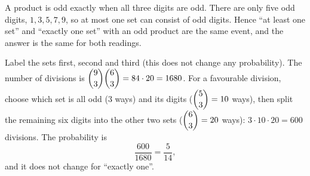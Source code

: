 A product is odd exactly when all three digits are odd. There are only five odd digits, $1,3,5,7,9$, so at most one set can consist of odd digits. Hence ``at least one set'' and ``exactly one set'' with an odd product are the same event, and the answer is the same for both readings.

Label the sets first, second and third (this does not change any probability). The number of divisions is $\dbinom93\dbinom63=84\cdot20=1680$. For a favourable division, choose which set is all odd ($3$ ways) and its digits ($\dbinom53=10$ ways), then split the remaining six digits into the other two sets ($\dbinom63=20$ ways): $3\cdot10\cdot20=600$ divisions. The probability is
\[
\dfrac{600}{1680}=\boxed{\dfrac{5}{14}},
\]
and it does not change for ``exactly one''.
